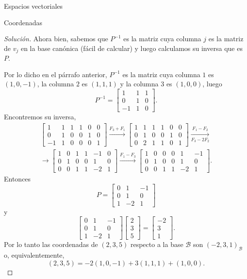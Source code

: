 \documentclass[a4paper,12pt,twoside,spanish,reqno]{amsbook}
\theoremstyle{definition}
\theoremstyle{remark}
\begin{document}
\begin{chapter}{Espacios vectoriales}
\begin{section}{Coordenadas}
\begin{proof}[Solución]
	
	Ahora bien, sabemos que $P^{-1}$ es la matriz cuya columna $j$ es la matriz de $v_j$ en la base canónica (fácil de calcular) y luego calculamos su inversa que es $P$.
	
	Por lo dicho en el párrafo anterior, $P^{-1}$  es la matriz cuya  columna $1$ es $(1,0,-1)$,  la columna $2$ es $(1,1,1)$ y la columna $3$ es $(1,0,0)$, luego 
	$$
	P^{-1} = \begin{bmatrix} 1&1&1\\0&1&0\\-1&1&0	\end{bmatrix}.
	$$ 
	Encontremos su inversa,
		\begin{multline*} 
	\left[\begin{array}{rrr|rrr}	1&1&1&1&0&0\\ 0&1&0&0&1&0\\ -1&1&0&0&0&1 \end{array}\right]
	\stackrel{F_3+ F_1}{\longrightarrow}
	\left[\begin{array}{rrr|rrr}	1&1&1&1&0&0\\ 0&1&0&0&1&0\\ 0&2&1&1&0&1 \end{array}\right]
	\underset{F_3-2F_2}{\stackrel{F_1 - F_2}{\longrightarrow}}\\
	\longrightarrow 
	\left[\begin{array}{rrr|rrr}	1&0&1&1&-1&0\\ 0&1&0&0&1&0\\ 0&0&1&1&-2&1 \end{array}\right]
	\stackrel{F_1 - F_3}{\longrightarrow}
	\left[\begin{array}{rrr|rrr}	1&0&0&0&1&-1\\ 0&1&0&0&1&0\\ 0&0&1&1&-2&1 \end{array}\right]
	.
	\end{multline*}
	Entonces 
	$$
	P = \left[\begin{array}{rrr}	0&1&-1\\ 0&1&0\\ 1&-2&1 \end{array}\right]
	$$
	y 
	$$
	\left[\begin{array}{rrr}	0&1&-1\\ 0&1&0\\ 1&-2&1 \end{array}\right]
	\left[\begin{array}{r} 2\\3\\5 \end{array}\right] = 
	\left[\begin{array}{r} -2\\3\\1 \end{array}\right].
	$$
	Por  lo tanto las coordenadas de   $(2,3,5)$ respecto a la base  $\mathcal{B}$ son $(-2,3,1)_{\mathcal B}$ o,  equivalentemente, 
	$$
	(2,3,5) = -2(1,0,-1)+3(1,1,1)+(1,0,0).
	$$
	

\end{proof}
\end{section}
\end{chapter}
\end{document}
